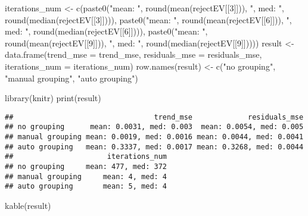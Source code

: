 \documentclass[
]{article}
\newenvironment{Shaded}{\begin{snugshade}}{\end{snugshade}}
\newcommand{\AttributeTok}[1]{\textcolor[rgb]{0.77,0.63,0.00}{#1}}
\newcommand{\DecValTok}[1]{\textcolor[rgb]{0.00,0.00,0.81}{#1}}
\newcommand{\FunctionTok}[1]{\textcolor[rgb]{0.00,0.00,0.00}{#1}}
\newcommand{\NormalTok}[1]{#1}
\newcommand{\OtherTok}[1]{\textcolor[rgb]{0.56,0.35,0.01}{#1}}
\newcommand{\StringTok}[1]{\textcolor[rgb]{0.31,0.60,0.02}{#1}}
\begin{document}
\begin{Shaded}
\begin{Highlighting}[]
\NormalTok{  iterations\_num }\OtherTok{\textless{}{-}} \FunctionTok{c}\NormalTok{(}\FunctionTok{paste0}\NormalTok{(}\StringTok{"mean: "}\NormalTok{, }\FunctionTok{round}\NormalTok{(}\FunctionTok{mean}\NormalTok{(rejectEV[[}\DecValTok{3}\NormalTok{]])), }\StringTok{", med: "}\NormalTok{, }\FunctionTok{round}\NormalTok{(}\FunctionTok{median}\NormalTok{(rejectEV[[}\DecValTok{3}\NormalTok{]]))),}
                     \FunctionTok{paste0}\NormalTok{(}\StringTok{"mean: "}\NormalTok{, }\FunctionTok{round}\NormalTok{(}\FunctionTok{mean}\NormalTok{(rejectEV[[}\DecValTok{6}\NormalTok{]])), }\StringTok{", med: "}\NormalTok{, }\FunctionTok{round}\NormalTok{(}\FunctionTok{median}\NormalTok{(rejectEV[[}\DecValTok{6}\NormalTok{]]))),}
                     \FunctionTok{paste0}\NormalTok{(}\StringTok{"mean: "}\NormalTok{, }\FunctionTok{round}\NormalTok{(}\FunctionTok{mean}\NormalTok{(rejectEV[[}\DecValTok{9}\NormalTok{]])), }\StringTok{", med: "}\NormalTok{, }\FunctionTok{round}\NormalTok{(}\FunctionTok{median}\NormalTok{(rejectEV[[}\DecValTok{9}\NormalTok{]]))))}
\NormalTok{  result }\OtherTok{\textless{}{-}} \FunctionTok{data.frame}\NormalTok{(}\AttributeTok{trend\_mse =}\NormalTok{ trend\_mse, }\AttributeTok{residuals\_mse =}\NormalTok{ residuals\_mse, }\AttributeTok{iterations\_num =}\NormalTok{ iterations\_num)}
  \FunctionTok{row.names}\NormalTok{(result) }\OtherTok{\textless{}{-}} \FunctionTok{c}\NormalTok{(}\StringTok{"no grouping"}\NormalTok{, }\StringTok{"manual grouping"}\NormalTok{, }\StringTok{"auto grouping"}\NormalTok{)}
  
  \FunctionTok{library}\NormalTok{(knitr)}
  \FunctionTok{print}\NormalTok{(result)}
\end{Highlighting}
\end{Shaded}

\begin{verbatim}
##                                 trend_mse             residuals_mse
## no grouping      mean: 0.0031, med: 0.003  mean: 0.0054, med: 0.005
## manual grouping mean: 0.0019, med: 0.0016 mean: 0.0044, med: 0.0041
## auto grouping   mean: 0.3337, med: 0.0017 mean: 0.3268, med: 0.0044
##                      iterations_num
## no grouping     mean: 477, med: 372
## manual grouping     mean: 4, med: 4
## auto grouping       mean: 5, med: 4
\end{verbatim}

\begin{Shaded}
\begin{Highlighting}[]
  \FunctionTok{kable}\NormalTok{(result)}
\end{Highlighting}
\end{Shaded}
\end{document}

